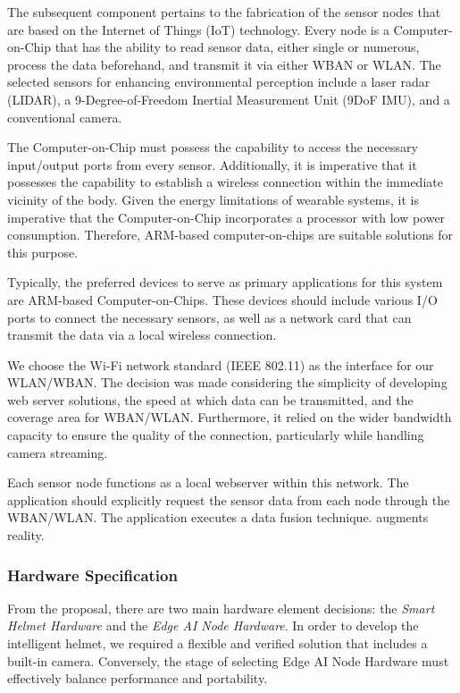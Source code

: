 The subsequent component pertains to the fabrication of the sensor nodes that are based on the Internet of Things (IoT) technology. Every node is a Computer-on-Chip that has the ability to read sensor data, either single or numerous, process the data beforehand, and transmit it via either WBAN or WLAN. The selected sensors for enhancing environmental perception include a laser radar (LIDAR), a 9-Degree-of-Freedom Inertial Measurement Unit (9DoF IMU), and a conventional camera.

The Computer-on-Chip must possess the capability to access the necessary input/output ports from every sensor. Additionally, it is imperative that it possesses the capability to establish a wireless connection within the immediate vicinity of the body. Given the energy limitations of wearable systems, it is imperative that the Computer-on-Chip incorporates a processor with low power consumption. Therefore, ARM-based computer-on-chips are suitable solutions for this purpose. 

Typically, the preferred devices to serve as primary applications for this system are ARM-based Computer-on-Chips. These devices should include various I/O ports to connect the necessary sensors, as well as a network card that can transmit the data via a local wireless connection.

We choose the Wi-Fi network standard (IEEE 802.11) as the interface for our WLAN/WBAN. The decision was made considering the simplicity of developing web server solutions, the speed at which data can be transmitted, and the coverage area for WBAN/WLAN. Furthermore, it relied on the wider bandwidth capacity to ensure the quality of the connection, particularly while handling camera streaming. 

Each sensor node functions as a local webserver within this network. The application should explicitly request the sensor data from each node through the WBAN/WLAN. The application executes a data fusion technique. augments reality.

\subsubsection{Hardware Specification}

From the proposal, there are two main hardware element decisions: the \textit{Smart Helmet Hardware} and the \textit{Edge AI Node Hardware}.  In order to develop the intelligent helmet, we required a flexible and verified solution that includes a built-in camera. Conversely, the stage of selecting Edge AI Node Hardware must effectively balance performance and portability.

